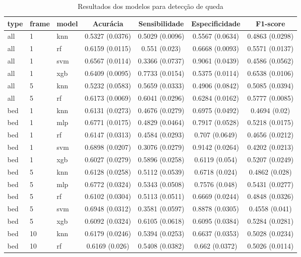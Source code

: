 \begin{table}
\caption{Resultados dos modelos para detecção de queda}
\label{tab:resultados_fall}
\begin{tabular}{lllcccc}
\toprule
type & frame & model & Acurácia & Sensibilidade & Especificidade & F1-score \\
\midrule
all & 1 & knn & 0.5327 (0.0376) & 0.5029 (0.0096) & 0.5567 (0.0634) & 0.4863 (0.0298) \\
all & 1 & rf & 0.6159 (0.0115) & 0.551 (0.023) & 0.6668 (0.0093) & 0.5571 (0.0137) \\
all & 1 & svm & 0.6567 (0.0114) & 0.3366 (0.0737) & 0.9061 (0.0439) & 0.4586 (0.0562) \\
all & 1 & xgb & 0.6409 (0.0095) & 0.7733 (0.0154) & 0.5375 (0.0114) & 0.6538 (0.0106) \\
all & 5 & knn & 0.5232 (0.0583) & 0.5659 (0.0333) & 0.4906 (0.0842) & 0.5085 (0.0394) \\
all & 5 & rf & 0.6173 (0.0069) & 0.6041 (0.0296) & 0.6284 (0.0162) & 0.5777 (0.0085) \\
bed & 1 & knn & 0.6131 (0.0273) & 0.4676 (0.0279) & 0.6975 (0.0492) & 0.4694 (0.02) \\
bed & 1 & mlp & 0.6771 (0.0175) & 0.4829 (0.0464) & 0.7917 (0.0528) & 0.5218 (0.0175) \\
bed & 1 & rf & 0.6147 (0.0313) & 0.4584 (0.0293) & 0.707 (0.0649) & 0.4656 (0.0212) \\
bed & 1 & svm & 0.6898 (0.0207) & 0.3076 (0.0279) & 0.9142 (0.0264) & 0.4202 (0.0213) \\
bed & 1 & xgb & 0.6027 (0.0279) & 0.5896 (0.0258) & 0.6119 (0.054) & 0.5207 (0.0249) \\
bed & 5 & knn & 0.6128 (0.0258) & 0.5112 (0.0539) & 0.6718 (0.024) & 0.4862 (0.028) \\
bed & 5 & mlp & 0.6772 (0.0324) & 0.5343 (0.0508) & 0.7576 (0.048) & 0.5431 (0.0277) \\
bed & 5 & rf & 0.6102 (0.0304) & 0.5113 (0.0511) & 0.6669 (0.0244) & 0.4848 (0.0326) \\
bed & 5 & svm & 0.6948 (0.0312) & 0.3581 (0.0597) & 0.8878 (0.0305) & 0.4558 (0.041) \\
bed & 5 & xgb & 0.6092 (0.0324) & 0.6105 (0.0618) & 0.6095 (0.0384) & 0.5284 (0.0281) \\
bed & 10 & knn & 0.6179 (0.0246) & 0.5394 (0.0253) & 0.6637 (0.0353) & 0.5028 (0.0234) \\
bed & 10 & rf & 0.6169 (0.026) & 0.5408 (0.0382) & 0.662 (0.0372) & 0.5026 (0.0114) \\

\end{tabular}
\end{table}
